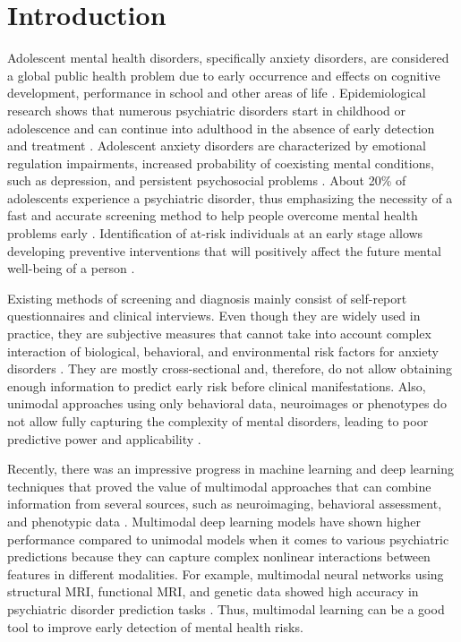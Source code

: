 \documentclass[10pt,letterpaper]{article}
\begin{document}
        \section*{Introduction}
        Adolescent mental health disorders, specifically anxiety disorders, are considered a global public health problem due to early occurrence and effects on cognitive development, performance in school and other areas of life \cite{ref36,ref37}. Epidemiological research shows that numerous psychiatric disorders start in childhood or adolescence and can continue into adulthood in the absence of early detection and treatment \cite{ref36,ref38}. Adolescent anxiety disorders are characterized by emotional regulation impairments, increased probability of coexisting mental conditions, such as depression, and persistent psychosocial problems \cite{ref17}. About 20\% of adolescents experience a psychiatric disorder, thus emphasizing the necessity of a fast and accurate screening method to help people overcome mental health problems early \cite{ref37}. Identification of at-risk individuals at an early stage allows developing preventive interventions that will positively affect the future mental well-being of a person \cite{ref38}.
        
        
        Existing methods of screening and diagnosis mainly consist of self-report questionnaires and clinical interviews. Even though they are widely used in practice, they are subjective measures that cannot take into account complex interaction of biological, behavioral, and environmental risk factors for anxiety disorders \cite{ref11,ref13}. They are mostly cross-sectional and, therefore, do not allow obtaining enough information to predict early risk before clinical manifestations. Also, unimodal approaches using only behavioral data, neuroimages or phenotypes do not allow fully capturing the complexity of mental disorders, leading to poor predictive power and applicability \cite{ref40}.
        
        
        
        Recently, there was an impressive progress in machine learning and deep learning techniques that proved the value of multimodal approaches that can combine information from several sources, such as neuroimaging, behavioral assessment, and phenotypic data \cite{ref1,ref25}. Multimodal deep learning models have shown higher performance compared to unimodal models when it comes to various psychiatric predictions because they can capture complex nonlinear interactions between features in different modalities. For example, multimodal neural networks using structural MRI, functional MRI, and genetic data showed high accuracy in psychiatric disorder prediction tasks \cite{ref25,ref39}. Thus, multimodal learning can be a good tool to improve early detection of mental health risks.
\end{document}
